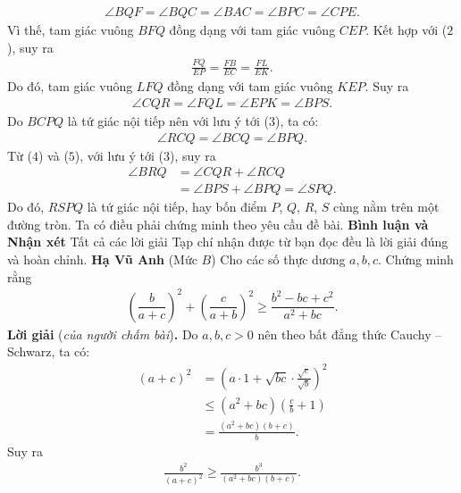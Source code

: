 \begin{multicols}{2}
\begin{align*}
		\angle BQF \!=\! \angle BQC \!=\! \angle BAC \!=\! \angle BPC\! =\! \angle CPE.
	\end{align*}
	Vì thế, tam giác vuông $BFQ$ đồng dạng với tam giác vuông $CEP$. Kết hợp với ($2$), suy ra
	\begin{align*}
		\frac{{FQ}}{{EP}} = \frac{{FB}}{{EC}} = \frac{{FL}}{{EK}}.
	\end{align*}
	Do đó, tam giác vuông $LFQ$ đồng dạng với tam giác vuông $KEP$. Suy ra
	\begin{align*}
		\angle CQR = \angle FQL = \angle EPK = \angle BPS. \tag{$4$}
	\end{align*}
	Do $BCPQ$ là tứ giác nội tiếp nên với lưu ý tới ($3$), ta có:
	\begin{align*}
		\angle RCQ = \angle BCQ = \angle BPQ. \tag{$5$}
	\end{align*}
	Từ ($4$) và ($5$), với lưu ý tới ($3$), suy ra
	\begin{align*}
		\angle BRQ &= \angle CQR + \angle RCQ \\
		&= \angle BPS + \angle BPQ = \angle SPQ.
	\end{align*}
	Do đó, $RSPQ$ là tứ giác nội tiếp, hay bốn điểm $P$, $Q$, $R$, $S$ cùng nằm trên một đường tròn.
	\vskip 0.05cm
	Ta có điều phải chứng minh theo yêu cầu đề bài.
	\vskip 0.05cm
	\textbf{\color{thachthuctoanhoc}Bình luận và Nhận xét}
	\vskip 0.05cm
	Tất cả các lời giải Tạp chí nhận được từ bạn đọc đều là lời giải đúng và hoàn chỉnh.
	\vskip 0.05cm
	\hfill \textbf{\color{thachthuctoanhoc}Hạ Vũ Anh}
	\vskip 0.05cm
	{}
	(Mức $B$) Cho các số thực dương $a,b,c$. Chứng minh rằng
	\begin{align*}
		\left(\dfrac b{a+c}\right)^2+\left(\dfrac{c}{a+b}\right)^2\ge \dfrac{b^2-bc+c^2}{a^2+bc}.
	\end{align*}
	\textbf{\color{thachthuctoanhoc}Lời giải} (\textit{của người chấm bài})\textbf{\color{thachthuctoanhoc}.}
	\vskip 0.05cm
	Do $a, b, c > 0$ nên theo bất đẳng thức Cauchy -- Schwarz, ta có:
	\begin{align*}
		{\left( {a + c} \right)^2} &= {\left( {a \cdot 1 + \sqrt {bc}  \cdot \frac{{\sqrt c }}{{\sqrt b }}} \right)^2} \\
		&\le \left( {{a^2} + bc} \right)\left( {\frac{c}{b} + 1} \right) \\
		&= \frac{{\left( {{a^2} + bc} \right)\left( {b + c} \right)}}{b}.
	\end{align*}
	Suy ra
	\begin{align*}
		\frac{{{b^2}}}{{{{\left( {a + c} \right)}^2}}} \ge \frac{{{b^3}}}{{\left( {{a^2} + bc} \right)\left( {b + c} \right)}}. \tag{$1$}

\end{align*}
\end{multicols}
